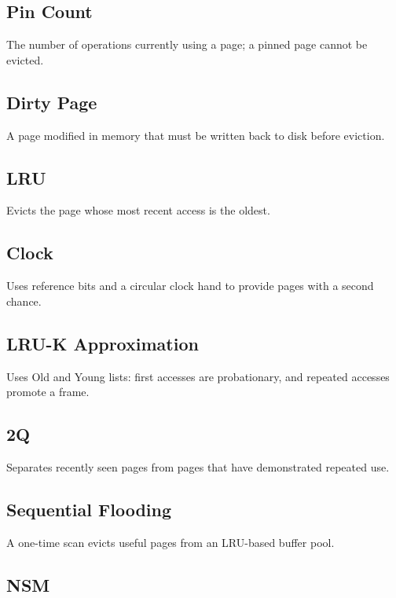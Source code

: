 \documentclass[12pt,a4paper]{article}
\begin{document}
\subsection*{Pin Count}

The number of operations currently using a page; a pinned page cannot be evicted.

\subsection*{Dirty Page}

A page modified in memory that must be written back to disk before eviction.

\subsection*{LRU}

Evicts the page whose most recent access is the oldest.

\subsection*{Clock}

Uses reference bits and a circular clock hand to provide pages with a second chance.

\subsection*{LRU-K Approximation}

Uses Old and Young lists: first accesses are probationary, and repeated accesses promote a frame.

\subsection*{2Q}

Separates recently seen pages from pages that have demonstrated repeated use.

\subsection*{Sequential Flooding}

A one-time scan evicts useful pages from an LRU-based buffer pool.

\subsection*{NSM}
\end{document}
